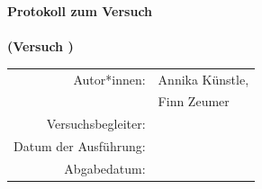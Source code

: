 \begin{titlepage}
\vspace*{2cm} 
  
  \centering
    
  {\LARGE\bfseries Protokoll zum Versuch \\[0.2cm]
  \textit{\versuchsname{\versuchsnummer}} \\[0.5cm] %
  {\large (Versuch {\versuchsnummer})}
  \vspace{1.25cm}}

  {\large
  \begin{tabular}{@{}rl@{}}
    Autor*innen:       & Annika Künstle,\\
                       & Finn Zeumer\\[0.5em]
    Versuchsbegleiter: & {\begleiter{\versuchsnummer}}\\[0.5em]
    Datum der Ausführung:& {\durchfuehrungsdatum{\versuchsnummer}}\\[0.5em]
    Abgabedatum:       & {\abgabedatum{\versuchsnummer}}\\[5em]
  \end{tabular}
  }
  \vfill


  
\end{titlepage}